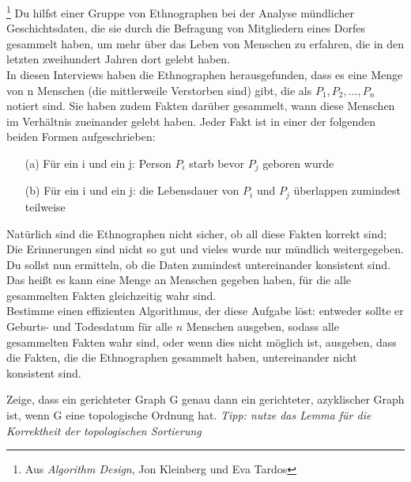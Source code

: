 \documentclass{uebung_cs}
\begin{document}
\begin{aufgabe}\footnote{Aus \textit{Algorithm Design}, Jon Kleinberg und Eva Tardos}
Du hilfst einer Gruppe von Ethnographen bei der Analyse mündlicher Geschichtsdaten, die sie durch die Befragung von Mitgliedern eines Dorfes gesammelt haben, um mehr über das Leben von Menschen zu erfahren, die in den letzten zweihundert Jahren dort gelebt haben.\\
In diesen Interviews haben die Ethnographen herausgefunden, dass es eine Menge von n Menschen (die mittlerweile Verstorben sind) gibt, die als $P_1, P_2, \ldots, P_n$ notiert sind.
Sie haben zudem Fakten darüber gesammelt, wann diese Menschen im Verhältnis zueinander gelebt haben. Jeder Fakt ist in einer der folgenden beiden Formen aufgeschrieben:
\begin{enumerate}
	\item[(a)] Für ein i und ein j: Person $P_i$ starb bevor $P_j$ geboren wurde
	\item[(b)] Für ein i und ein j: die Lebensdauer von $P_i$ und $P_j$ überlappen zumindest teilweise
\end{enumerate}
Natürlich sind die Ethnographen nicht sicher, ob all diese Fakten korrekt sind; Die Erinnerungen sind nicht so gut und vieles wurde nur mündlich weitergegeben.
Du sollst nun ermitteln, ob die Daten zumindest untereinander konsistent sind.
Das heißt es kann eine Menge an Menschen gegeben haben, für die alle gesammelten Fakten gleichzeitig wahr sind.\\
Bestimme einen effizienten Algorithmus, der diese Aufgabe löst: entweder sollte er Geburts- und Todesdatum für alle $n$ Menschen ausgeben, sodass alle gesammelten Fakten wahr sind, oder wenn dies nicht möglich ist, ausgeben, dass die Fakten, die die Ethnographen gesammelt haben, untereinander nicht konsistent sind. 
\end{aufgabe}


\begin{aufgabe}
Zeige, dass ein gerichteter Graph G genau dann ein gerichteter, azyklischer Graph ist, wenn G eine topologische Ordnung hat.
\textit{Tipp: nutze das Lemma für die Korrektheit der topologischen Sortierung}
\end{aufgabe}
\end{document}

